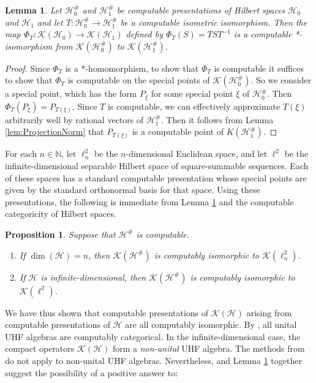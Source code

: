 \documentclass{amsart}
\theoremstyle{plain}
\newtheorem{lemma}[theorem]{Lemma}
\newtheorem{proposition}[theorem]{Proposition}
\theoremstyle{definition}
\numberwithin{equation}{section}
\begin{document}
\begin{lemma}\label{lem:compConjugation}
Let $\mathcal{H}_0^\#$ and $\mathcal{H}_1^\#$ be computable presentations of Hilbert spaces $\mathcal{H}_0$ and $\mathcal{H}_1$ and let $T : \mathcal{H}_0 ^\#\to \mathcal{H}_1^\#$ be a computable isometric isomorphism.  Then the map $\Phi_T : \mathcal{K}(\mathcal{H}_0) \to \mathcal{K}(\mathcal{H}_1)$ defined by $\Phi_T(S) = TST^{-1}$ is a computable *-isomorphism from $\mathcal{K}(\mathcal{H}_0^\#)$ to $\mathcal{K}(\mathcal{H}_1^\#)$.
\end{lemma}
\begin{proof}
Since $\Phi_T$ is a $*$-homomorphism, to show that $\Phi_T$ is computable it suffices to show that $\Phi_T$ is computable on the special points of $\mathcal{K}(\mathcal{H}_0^\#)$.  So we consider a special point, which has the form $P_\xi$ for some special point $\xi$ of $\mathcal{H}_0^\#$.  Then $\Phi_T(P_\xi) = P_{T(\xi)}$.  Since $T$ is computable, we can effectively approximate $T(\xi)$ arbitrarily well by rational vectors of $\mathcal{H}_1^\#$. Then it follows from Lemma \ref{lem:ProjectionNorm} that $P_{T(\xi)}$ is a computable point of $K(\mathcal{H}_1^\#)$.
\end{proof}

For each $n \in \mathbb{N}$, let $\ell^2_n$ be the $n$-dimensional Euclidean space, and let $\ell^2$ be the infinite-dimensional separable Hilbert space of square-summable sequences.  Each of these spaces has a standard computable presentation whose special points are given by the standard orthonormal basis for that space.  Using these presentations, the following is immediate from Lemma \ref{lem:compConjugation} and the computable categoricity of Hilbert spaces.

\begin{proposition}
Suppose that $\mathcal{H}^\#$ is computable.
\begin{enumerate}
\item{If $\dim(\mathcal{H}) = n$, then $\mathcal{K}(\mathcal{H}^\#)$ is computably isomorphic to $\mathcal{K}(\ell_n^2)$.}
\item{If $\mathcal{H}$ is infinite-dimensional, then $\mathcal{K}(\mathcal{H}^\#)$ is computably isomorphic to $\mathcal{K}(\ell^2)$.}
\end{enumerate}
\end{proposition}

We have thus shown that computable presentations of $\mathcal{K}(\mathcal{H})$ arising from computable presentations of $\mathcal{H}$ are all computably isomorphic.  By \cite[Theorem 4.18]{UHFPaper}, all unital UHF algebras are computably categorical.  In the infinite-dimensional case, the compact operators $\mathcal{K}(\mathcal{H})$ form a \emph{non-unital} UHF algebra.  The methods from \cite{UHFPaper} do not apply to non-unital UHF algebras. Nevertheless, \cite[Theorem 4.18]{UHFPaper} and Lemma \ref{lem:compConjugation} together suggest the possibility of a positive answer to:
\end{document}
